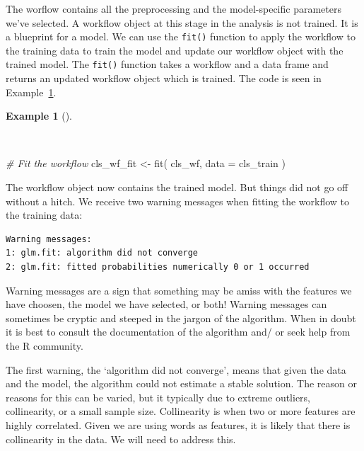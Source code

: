 \documentclass[
  letterpaper,
  DIV=11,
  numbers=noendperiod]{scrreprt}
\newenvironment{Shaded}{\begin{snugshade}}{\end{snugshade}}
\newcommand{\AttributeTok}[1]{\textcolor[rgb]{0.00,0.00,0.00}{#1}}
\newcommand{\CommentTok}[1]{\textcolor[rgb]{0.00,0.00,0.00}{\textit{#1}}}
\newcommand{\FunctionTok}[1]{\textcolor[rgb]{0.00,0.00,0.00}{#1}}
\newcommand{\NormalTok}[1]{\textcolor[rgb]{0.00,0.00,0.00}{#1}}
\newcommand{\OtherTok}[1]{\textcolor[rgb]{0.00,0.00,0.00}{#1}}
\theoremstyle{definition}
\newtheorem{example}{Example}[chapter]
\theoremstyle{remark}
\begin{document}
The worflow contains all the preprocessing and the model-specific
parameters we've selected. A workflow object at this stage in the
analysis is not trained. It is a blueprint for a model. We can use the
\texttt{fit()} function to apply the workflow to the training data to
train the model and update our workflow object with the trained model.
The \texttt{fit()} function takes a workflow and a data frame and
returns an updated workflow object which is trained. The code is seen in
Example~\ref{exm-pda-class-workflow-fit}.

\begin{example}[]\protect\hypertarget{exm-pda-class-workflow-fit}{}\label{exm-pda-class-workflow-fit}

~

\begin{Shaded}
\begin{Highlighting}[]
\CommentTok{\# Fit the workflow}
\NormalTok{cls\_wf\_fit }\OtherTok{\textless{}{-}}
  \FunctionTok{fit}\NormalTok{(}
\NormalTok{    cls\_wf,}
    \AttributeTok{data =}\NormalTok{ cls\_train}
\NormalTok{    )}
\end{Highlighting}
\end{Shaded}

\end{example}

The workflow object now contains the trained model. But things did not
go off without a hitch. We receive two warning messages when fitting the
workflow to the training data:

\begin{verbatim}
Warning messages:
1: glm.fit: algorithm did not converge
2: glm.fit: fitted probabilities numerically 0 or 1 occurred
\end{verbatim}

Warning messages are a sign that something may be amiss with the
features we have choosen, the model we have selected, or both! Warning
messages can sometimes be cryptic and steeped in the jargon of the
algorithm. When in doubt it is best to consult the documentation of the
algorithm and/ or seek help from the R community.

The first warning, the `algorithm did not converge', means that given
the data and the model, the algorithm could not estimate a stable
solution. The reason or reasons for this can be varied, but it typically
due to extreme outliers, collinearity, or a small sample size.
Collinearity is when two or more features are highly correlated. Given
we are using words as features, it is likely that there is collinearity
in the data. We will need to address this.
\end{document}
